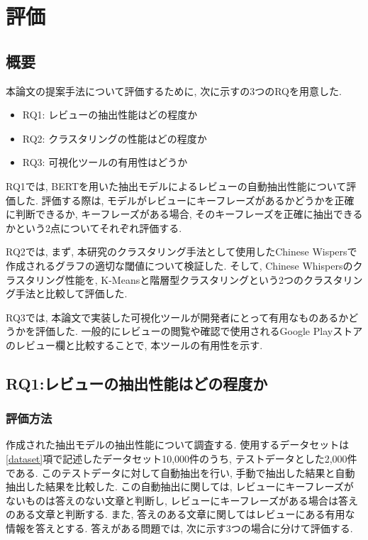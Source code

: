\chapter{評価}
\label{chap:kekkahyouka}

\section{概要}
本論文の提案手法について評価するために, 次に示すの3つのRQを用意した. 

\begin{itemize}
  \item RQ1: レビューの抽出性能はどの程度か
  \item RQ2: クラスタリングの性能はどの程度か
  \item RQ3: 可視化ツールの有用性はどうか
\end{itemize}

RQ1では, BERTを用いた抽出モデルによるレビューの自動抽出性能について評価した. 評価する際は, モデルがレビューにキーフレーズがあるかどうかを正確に判断できるか, キーフレーズがある場合, そのキーフレーズを正確に抽出できるかという2点についてそれぞれ評価する. 

RQ2では, まず, 本研究のクラスタリング手法として使用したChinese Wispersで作成されるグラフの適切な閾値について検証した. そして, Chinese Whispersのクラスタリング性能を, K-Meansと階層型クラスタリングという2つのクラスタリング手法と比較して評価した. 

RQ3では, 本論文で実装した可視化ツールが開発者にとって有用なものあるかどうかを評価した. 一般的にレビューの閲覧や確認で使用されるGoogle Playストアのレビュー欄と比較することで, 本ツールの有用性を示す. 

\section{RQ1:レビューの抽出性能はどの程度か}
\subsection{評価方法}\label{method}
作成された抽出モデルの抽出性能について調査する. 使用するデータセットは\ref{dataset}項で記述したデータセット10,000件のうち, テストデータとした2,000件である. このテストデータに対して自動抽出を行い, 手動で抽出した結果と自動抽出した結果を比較した. 
この自動抽出に関しては, レビューにキーフレーズがないものは答えのない文章と判断し, レビューにキーフレーズがある場合は答えのある文章と判断する. また, 答えのある文章に関してはレビューにある有用な情報を答えとする. 
答えがある問題では, 次に示す3つの場合に分けて評価する. 

